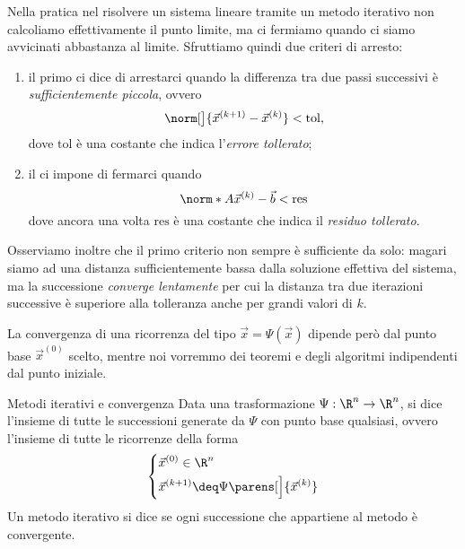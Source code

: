 \begin{remark}
    Nella pratica nel risolvere un sistema lineare tramite un metodo iterativo non calcoliamo effettivamente il punto limite, ma ci fermiamo quando ci siamo avvicinati abbastanza al limite. Sfruttiamo quindi due criteri di arresto: \begin{enumerate}[(1)]
        \item il primo ci dice di arrestarci quando la differenza tra due passi successivi è \emph{sufficientemente piccola}, ovvero \[
            \norm[\big]{\vec x^{(k+1)} - \vec x^{(k)}} < \mathrm{tol},
        \] dove $\mathrm{tol}$ è una costante che indica l'\emph{errore tollerato};
        \item il  ci impone di fermarci quando \[
            \norm*{A\vec x^{(k)} - \vec b} < \mathrm{res}
        \] dove ancora una volta $\mathrm{res}$ è una costante che indica il \emph{residuo tollerato}. 
    \end{enumerate}

    Osserviamo inoltre che il primo criterio non sempre è sufficiente da solo: magari siamo ad una distanza sufficientemente bassa dalla soluzione effettiva del sistema, ma la successione \emph{converge lentamente} per cui la distanza tra due iterazioni successive è superiore alla tolleranza anche per grandi valori di $k$.
\end{remark}

La convergenza di una ricorrenza del tipo $\vec x = \Psi(\vec x)$ dipende però dal punto base $\vec x^{(0)}$ scelto, mentre noi vorremmo dei teoremi e degli algoritmi indipendenti dal punto iniziale.

\begin{definition}
    {Metodi iterativi e convergenza}{}
    Data una trasformazione $\Psi : \R^n \to \R^n$, si dice  l'insieme di tutte le successioni generate da $\Psi$ con punto base qualsiasi, ovvero l'insieme di tutte le ricorrenze della forma \begin{equation} \label{eq:iter_method_def}
        \left\{
        \begin{aligned}
            &\vec x^{(0)} \in \R^n\\
            &\vec x^{(k+1)} \deq \Psi\parens[\Big]{\vec x^{(k)}}
        \end{aligned}
        \right.
    \end{equation} Un metodo iterativo si dice  se ogni successione che appartiene al metodo è convergente.
\end{definition}

